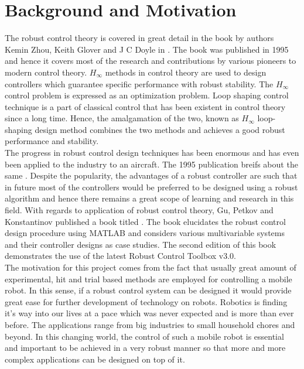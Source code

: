 \documentclass[a4paper,12pt]{article}
\begin{document}
\section{Background and Motivation}
The robust control theory is covered in great detail in the book by authors Kemin Zhou, Keith Glover and J C Doyle in  \cite{book}. The book was published in 1995 and hence it covers most of the research and contributions by various pioneers to modern control theory. $H_{\infty}$ methods in control theory are used to design controllers which guarantee specific performance with robust stability. The $H_{\infty}$ control problem is expressed as an optimization problem. Loop shaping control technique is a part of classical control that has been existent in control theory since a long time. Hence, the amalgamation of the two, known as $H_{\infty}$ loop-shaping design method combines the two methods and achieves a good robust performance and stability. \\
The progress in robust control design techniques has been enormous and has even been applied to the industry to an aircraft. The 1995 publication breifs about the same \cite{aero}. Despite the popularity, the advantages of a robust controller are such that in future most of the controllers would be preferred to be designed using a robust algorithm and hence there remains a great scope of learning and research in this field. With regards to application of robust control theory, Gu, Petkov and Konstantinov published a book titled  \cite{Gu}. The book elucidates the robust control design procedure using MATLAB and considers various multivariable systems and their controller designs as case studies. The second edition of this book demonstrates the use of the latest Robust Control Toolbox v3.0.\\
The motivation for this project comes from the fact that usually great amount of experimental, hit and trial based methods are employed for controlling a mobile robot. In this sense, if a robust control system can be designed it would provide great ease for further development of technology on robots. Robotics is finding it's way into our lives at a pace which was never expected and is more than ever before. The applications range from big industries to small household chores and beyond. In this changing world, the control of such a mobile robot is essential and important to be achieved in a very robust manner so that more and more complex applications can be designed on top of it. \\
\end{document}
